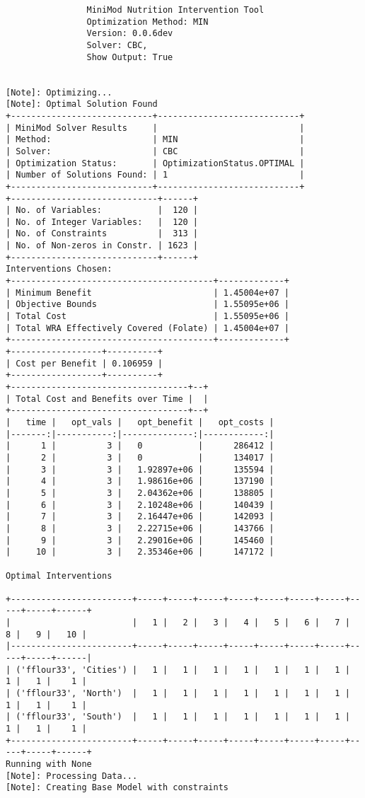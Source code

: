 \documentclass[
]{article}
\begin{document}
\begin{verbatim}
                MiniMod Nutrition Intervention Tool
                Optimization Method: MIN
                Version: 0.0.6dev
                Solver: CBC,
                Show Output: True
                
                
[Note]: Optimizing...
[Note]: Optimal Solution Found
+----------------------------+----------------------------+
| MiniMod Solver Results     |                            |
| Method:                    | MIN                        |
| Solver:                    | CBC                        |
| Optimization Status:       | OptimizationStatus.OPTIMAL |
| Number of Solutions Found: | 1                          |
+----------------------------+----------------------------+
+-----------------------------+------+
| No. of Variables:           |  120 |
| No. of Integer Variables:   |  120 |
| No. of Constraints          |  313 |
| No. of Non-zeros in Constr. | 1623 |
+-----------------------------+------+
Interventions Chosen:
+----------------------------------------+-------------+
| Minimum Benefit                        | 1.45004e+07 |
| Objective Bounds                       | 1.55095e+06 |
| Total Cost                             | 1.55095e+06 |
| Total WRA Effectively Covered (Folate) | 1.45004e+07 |
+----------------------------------------+-------------+
+------------------+----------+
| Cost per Benefit | 0.106959 |
+------------------+----------+
+-----------------------------------+--+
| Total Cost and Benefits over Time |  |
+-----------------------------------+--+
|   time |   opt_vals |   opt_benefit |   opt_costs |
|-------:|-----------:|--------------:|------------:|
|      1 |          3 |   0           |      286412 |
|      2 |          3 |   0           |      134017 |
|      3 |          3 |   1.92897e+06 |      135594 |
|      4 |          3 |   1.98616e+06 |      137190 |
|      5 |          3 |   2.04362e+06 |      138805 |
|      6 |          3 |   2.10248e+06 |      140439 |
|      7 |          3 |   2.16447e+06 |      142093 |
|      8 |          3 |   2.22715e+06 |      143766 |
|      9 |          3 |   2.29016e+06 |      145460 |
|     10 |          3 |   2.35346e+06 |      147172 |

Optimal Interventions

+------------------------+-----+-----+-----+-----+-----+-----+-----+-----+-----+------+
|                        |   1 |   2 |   3 |   4 |   5 |   6 |   7 |   8 |   9 |   10 |
|------------------------+-----+-----+-----+-----+-----+-----+-----+-----+-----+------|
| ('fflour33', 'Cities') |   1 |   1 |   1 |   1 |   1 |   1 |   1 |   1 |   1 |    1 |
| ('fflour33', 'North')  |   1 |   1 |   1 |   1 |   1 |   1 |   1 |   1 |   1 |    1 |
| ('fflour33', 'South')  |   1 |   1 |   1 |   1 |   1 |   1 |   1 |   1 |   1 |    1 |
+------------------------+-----+-----+-----+-----+-----+-----+-----+-----+-----+------+
Running with None
[Note]: Processing Data...
[Note]: Creating Base Model with constraints


\end{verbatim}
\end{document}

